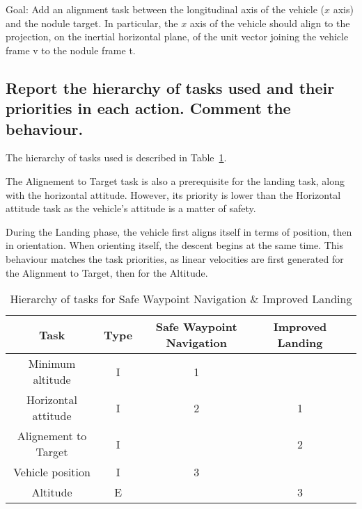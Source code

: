 	Goal: Add an alignment task between the longitudinal axis of the vehicle ($x$
	axis) and the nodule target. In particular, the $x$ axis of the vehicle should
	align to the projection, on the inertial horizontal plane, of the unit vector
	joining the vehicle frame \cframe v to the nodule frame \cframe t.
	\begin{parts}
		\part{Report the hierarchy of tasks used and their priorities in
		each action. Comment the behaviour.}

		\begin{solutionorbox}
			The hierarchy of tasks used is described in
			Table~\ref{table:tkip_swn_improved_landing_robust}.
			
			The Alignement to Target task is also a prerequisite for the
			landing task, along with the horizontal attitude.
			However, its priority is lower than the Horizontal
			attitude task as the vehicle's attitude is a matter of
			safety.

			During the Landing phase, the vehicle first aligns
			itself in terms of position, then in orientation. When
			orienting itself, the descent begins at the same time.
			This behaviour matches the task priorities, as linear
			velocities are first generated for the Alignment to
			Target, then for the Altitude.
		\end{solutionorbox}
		\begin{table}[htb]
			\caption{Hierarchy of tasks for Safe Waypoint Navigation
			\& Improved Landing}
			\label{table:tkip_swn_improved_landing_robust}
			\begin{center}
				\footnotesize
				\begin{tabular}{ccccc}
					\toprule
					Task & Type & Safe Waypoint Navigation &
					Improved Landing
					\\
					\midrule
					Minimum altitude & I & 1 & \\
					\hdashline
					Horizontal attitude & I & 2 & 1\\
					\hdashline
					Alignement to Target & I & & 2\\
					\hdashline
					Vehicle position & I & 3 & \\
					\hdashline
					Altitude & E &  & 3\\
					\bottomrule
				\end{tabular}
			\end{center}
		\end{table}%



\end{parts}
